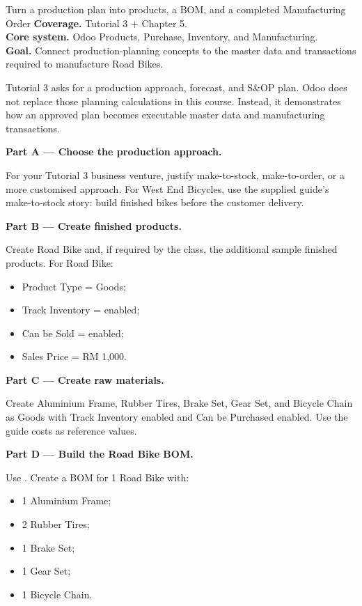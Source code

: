 
\begin{labproject}{Turn a production plan into products, a BOM, and a completed Manufacturing Order}
\textbf{Coverage.} Tutorial 3 + Chapter 5.\\
\textbf{Core system.} Odoo Products, Purchase, Inventory, and Manufacturing.\\
\textbf{Goal.} Connect production-planning concepts to the master data and transactions required to manufacture Road Bikes.

\begin{labmode}
Tutorial 3 asks for a production approach, forecast, and S\&OP plan. Odoo does not replace those planning calculations in this course. Instead, it demonstrates how an approved plan becomes executable master data and manufacturing transactions.
\end{labmode}

\medskip\noindent\textbf{Part A --- Choose the production approach.}

For your Tutorial 3 business venture, justify make-to-stock, make-to-order, or a more customised approach. For West End Bicycles, use the supplied guide's make-to-stock story: build finished bikes before the customer delivery.

\medskip\noindent\textbf{Part B --- Create finished products.}

Create Road Bike and, if required by the class, the additional sample finished products. For Road Bike:
\begin{itemize}
  \item Product Type = Goods;
  \item Track Inventory = enabled;
  \item Can be Sold = enabled;
  \item Sales Price = RM 1,000.
\end{itemize}

\medskip\noindent\textbf{Part C --- Create raw materials.}

Create Aluminium Frame, Rubber Tires, Brake Set, Gear Set, and Bicycle Chain as Goods with Track Inventory enabled and Can be Purchased enabled. Use the guide costs as reference values.

\medskip\noindent\textbf{Part D --- Build the Road Bike BOM.}

Use . Create a BOM for 1 Road Bike with:
\begin{itemize}
  \item 1 Aluminium Frame;
  \item 2 Rubber Tires;
  \item 1 Brake Set;
  \item 1 Gear Set;
  \item 1 Bicycle Chain.
\end{itemize}


\end{labproject}
